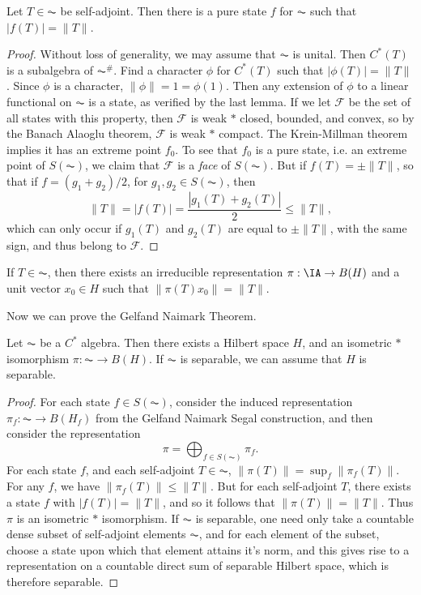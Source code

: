 \begin{lemma}
    Let $T \in \AC$ be self-adjoint. Then there is a pure state $f$ for $\AC$ such that $|f(T)| = \| T \|$.
\end{lemma}
\begin{proof}
    Without loss of generality, we may assume that $\AC$ is unital. Then $C^*(T)$ is a subalgebra of $\AC^\#$. Find a character $\phi$ for $C^*(T)$ such that $|\phi(T)| = \| T \|$. Since $\phi$ is a character, $\| \phi \| = 1 = \phi(1)$. Then any extension of $\phi$ to a linear functional on $\AC$ is a state, as verified by the last lemma. If we let $\mathcal{F}$ be the set of all states with this property, then $\mathcal{F}$ is weak $*$ closed, bounded, and convex, so by the Banach Alaoglu theorem, $\mathcal{F}$ is weak $*$ compact. The Krein-Millman theorem implies it has an extreme point $f_0$. To see that $f_0$ is a pure state, i.e. an extreme point of $S(\AC)$, we claim that $\mathcal{F}$ is a \emph{face} of $S(\AC)$. But if $f(T) = \pm \| T \|$, so that if $f = (g_1 + g_2) / 2$, for $g_1,g_2 \in S(\AC)$, then
    \[ \| T \| = |f(T)| = \frac{|g_1(T) + g_2(T)|}{2} \leq \| T \|, \]
    which can only occur if $g_1(T)$ and $g_2(T)$ are equal to $\pm \| T \|$, with the same sign, and thus belong to $\mathcal{F}$.
\end{proof}

\begin{corollary}
    If $T \in \AC$, then there exists an irreducible representation $\pi: \IA \to B(H)$ and a unit vector $x_0 \in H$ such that $\| \pi(T) x_0 \| = \| T \|$.
\end{corollary}

Now we can prove the Gelfand Naimark Theorem.

\begin{theorem}
    Let $\AC$ be a $C^*$ algebra. Then there exists a Hilbert space $H$, and an isometric $*$ isomorphism $\pi: \AC \to B(H)$. If $\AC$ is separable, we can assume that $H$ is separable.
\end{theorem}
\begin{proof}
    For each state $f \in S(\AC)$, consider the induced representation $\pi_f: \AC \to B(H_f)$ from the Gelfand Naimark Segal construction, and then consider the representation
    \[ \pi = \bigoplus_{f \in S(\AC)} \pi_f. \]
    For each state $f$, and each self-adjoint $T \in \AC$, $\| \pi(T) \| = \sup_f \| \pi_f(T) \|$. For any $f$, we have $\| \pi_f(T) \| \leq \| T \|$. But for each self-adjoint $T$, there exists a state $f$ with $|f(T)| = \| T \|$, and so it follows that $\| \pi(T) \| = \| T \|$. Thus $\pi$ is an isometric $*$ isomorphism. If $\AC$ is separable, one need only take a countable dense subset of self-adjoint elements $\AC$, and for each element of the subset, choose a state upon which that element attains it's norm, and this gives rise to a representation on a countable direct sum of separable Hilbert space, which is therefore separable.
\end{proof}

